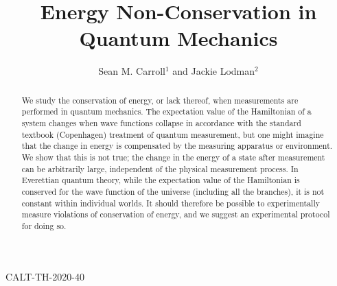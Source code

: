\documentclass[12pt,aps,prd,onecolumn,nofootinbib,notitlepage]{revtex4-1}
\begin{document}
\hfill CALT-TH-2020-40
\hfill

\vspace{0.5cm}
\thispagestyle{empty}

\newcommand{\be}{\begin{equation}}
\newcommand{\ee}{\end{equation}}
\newcommand{\bea}{\begin{eqnarray}}
\newcommand{\eea}{\end{eqnarray}}
\newcommand{\hst}{\widetilde{\mathcal{H}}} 
\newcommand{\iso}{\dot{=}}
\newcommand{\Dim}{\mathrm{dim\,}}
\newcommand{\Tr}{\mathrm{Tr}}
\newcommand{\hs}{\mathcal{H}} 
\newcommand{\ham}{\hat{H}}
\newcommand{\intham}{\widehat{H}_{\rm{int}}}
\newcommand{\selfham}{\widehat{H}_{\rm{self}}}
\def\bra#1{\langle #1\rvert}
\def\ket#1{\lvert #1\rangle}
\newcommand{\draftnote}[1]{\textbf{\color{red}[#1]}}
\newcommand{\psiuu}{\psi_{\uparrow\uparrow}}
\newcommand{\psiud}{\psi_{\uparrow\downarrow}}
\newcommand{\psidu}{\psi_{\downarrow\uparrow}}
\newcommand{\psidd}{\psi_{\downarrow\downarrow}}


\title{Energy Non-Conservation in Quantum Mechanics}
\author{Sean M. Carroll$^1$ and Jackie Lodman$^2$}

\begin{abstract}
We study the conservation of energy, or lack thereof, when measurements are performed in quantum mechanics.
The expectation value of the Hamiltonian of a system changes when wave functions collapse in accordance with the standard textbook (Copenhagen) treatment of quantum measurement, but one might imagine that the change in energy is compensated by the measuring apparatus or environment.
We show that this is not true; the change in the energy of a state after measurement can be arbitrarily large, independent of the physical measurement process.
In Everettian quantum theory, while the expectation value of the Hamiltonian is conserved for the wave function of the universe (including all the branches), it is not constant within individual worlds.
It should therefore be possible to experimentally measure violations of conservation of energy, and we suggest an experimental protocol for doing so.
\end{abstract}
\end{document}
